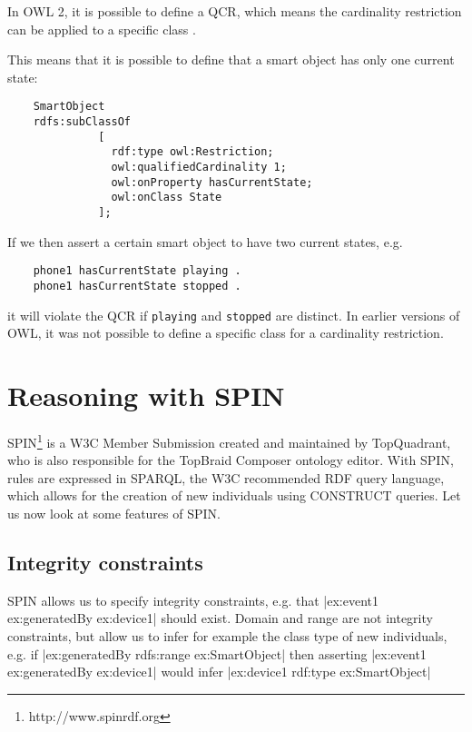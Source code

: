 In \ac{OWL} 2, it is possible to define a \ac{QCR}, which means the cardinality restriction can be applied to a specific class \cite{Hebeler2009}. %


 This means that it is possible to define that a smart object has only one current state:

\begin{verbatim}
	SmartObject
	rdfs:subClassOf
	          [
	            rdf:type owl:Restriction;
	            owl:qualifiedCardinality 1;
	            owl:onProperty hasCurrentState;
	            owl:onClass State
	          ];
\end{verbatim}

If we then assert a certain smart object to have two current states, e.g.

\begin{verbatim}
	phone1 hasCurrentState playing .
	phone1 hasCurrentState stopped .
\end{verbatim}

it will violate the \ac{QCR} if \texttt{playing} and \texttt{stopped} are distinct. In earlier versions of \ac{OWL}, it was not possible to define a specific class for a cardinality restriction.





\section{Reasoning with SPIN}
\label{SPIN}
\ac{SPIN}\footnote{http://www.spinrdf.org} is a W3C Member Submission created and maintained by TopQuadrant, who is also responsible for the TopBraid Composer ontology editor. With \ac{SPIN}, rules are expressed in \ac{SPARQL}, the W3C recommended \ac{RDF} query language, which allows for the creation of new individuals using CONSTRUCT queries. Let us now look at some features of \ac{SPIN}.


\subsection{Integrity constraints}

\ac{SPIN} allows us to specify integrity constraints, e.g. that |ex:event1 ex:generatedBy ex:device1| should exist. Domain and range are not integrity constraints, but allow us to infer for example the class type of new individuals, e.g. if |ex:generatedBy rdfs:range ex:SmartObject| then asserting |ex:event1 ex:generatedBy ex:device1| would infer |ex:device1 rdf:type ex:SmartObject|

